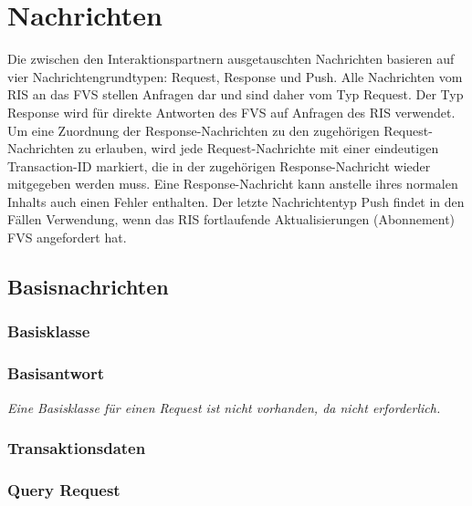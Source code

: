 \chapter{Nachrichten}
\label{cha:Nachrichten}
Die zwischen den Interaktionspartnern ausgetauschten Nachrichten basieren auf vier Nachrichtengrundtypen: Request, Response und Push. Alle Nachrichten vom RIS an das FVS stellen Anfragen dar und sind daher vom Typ Request. Der Typ Response wird für direkte Antworten des FVS auf Anfragen des RIS verwendet. Um eine Zuordnung der Response-Nachrichten zu den zugehörigen Request-Nachrichten zu erlauben, wird jede Request-Nachrichte mit einer eindeutigen Transaction-ID markiert, die in der zugehörigen Response-Nachricht wieder mitgegeben werden muss. Eine Response-Nachricht kann anstelle ihres normalen Inhalts auch einen Fehler enthalten. Der letzte Nachrichtentyp Push findet in den Fällen Verwendung, wenn das RIS fortlaufende Aktualisierungen (Abonnement) FVS angefordert hat. 

\section{Basisnachrichten}
\label{sec:Nachrichten:Basisnachrichten}

\subsection*{Basisklasse}



\subsection*{Basisantwort}


\medskip

\textit{Eine Basisklasse für einen Request ist nicht vorhanden, da nicht erforderlich.}

\subsection*{Transaktionsdaten}



\subsection*{Query Request}



